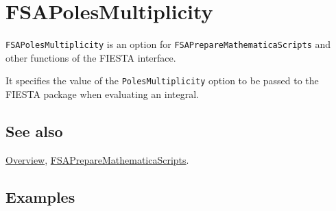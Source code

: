 \documentclass[../FeynHelpersManual.tex]{subfiles}
\begin{document}
\hypertarget{fsapolesmultiplicity}{
\section{FSAPolesMultiplicity}\label{fsapolesmultiplicity}}

\texttt{FSAPolesMultiplicity} is an option for
\texttt{FSAPrepareMathematicaScripts} and other functions of the FIESTA
interface.

It specifies the value of the \texttt{PolesMultiplicity} option to be
passed to the FIESTA package when evaluating an integral.

\subsection{See also}

\hyperlink{toc}{Overview},
\hyperlink{fsapreparemathematicascripts}{FSAPrepareMathematicaScripts}.

\subsection{Examples}
\end{document}
